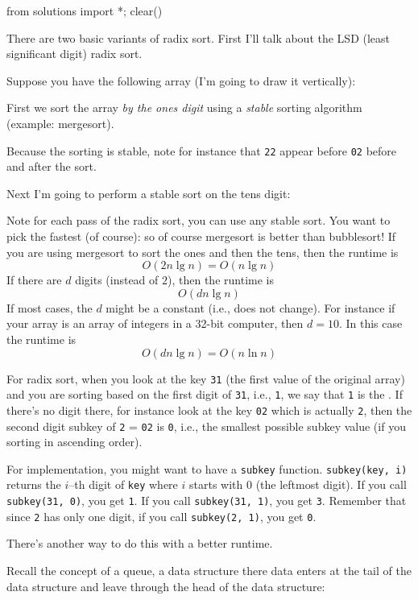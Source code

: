 \begin{python0}
from solutions import *; clear()
\end{python0}

There are two basic variants of radix sort.
First I'll talk about the LSD (least significant digit) radix sort.


Suppose you have the following array (I'm going to draw it vertically):

First we sort the array \textit{by the ones digit} using a 
\textit{stable} sorting algorithm (example: mergesort).

Because the sorting is stable, note for instance that 
\verb!22! appear before \verb!02! before and after the sort.

Next I'm going to perform a stable sort on the tens digit:


Note for each pass of the radix sort, you can use any stable sort.
You want to pick the fastest (of course): so of course mergesort is better than bubblesort!
If you are using mergesort to sort the ones and then the tens, then the
runtime is
\[
  O(2 n \lg n) = O(n \lg n)
\]
If there are $d$ digits (instead of $2$), then the runtime is
\[
  O(d n \lg n)
\]
If most cases, the $d$ might be a constant (i.e., does not change).
For instance if your array is an array of integers in a 32-bit
computer, then $d = 10$.
In this case the runtime is
\[
  O(d n \lg n) = O(n \ln n)
\]

For radix sort, when you look at the key \verb!31! (the first value of the
original array) and you are sorting based on the first digit of \verb!31!,
i.e., \verb!1!, we say that \verb!1! is the .
If there's no digit there, for instance look at the key \verb!02! which is
actually \verb!2!, then the second digit subkey of \verb!2! = \verb!02! is
\verb!0!, i.e., the smallest possible subkey value (if you sorting in
ascending order). 

For implementation, you might want to have a \verb!subkey! function.
\verb!subkey(key, i)! returns the $i$--th digit of \verb!key! where
$i$ starts with $0$ (the leftmost digit).
If you call \verb!subkey(31, 0)!, you get \verb!1!.
If you call \verb!subkey(31, 1)!, you get \verb!3!.
Remember that since \verb!2! has only one digit,
if you call \verb!subkey(2, 1)!, you get \verb!0!.

There's another way to do this with a better runtime.

Recall the concept of a queue, a data structure there data enters at
the tail of the data structure and leave through the head of the data structure:

